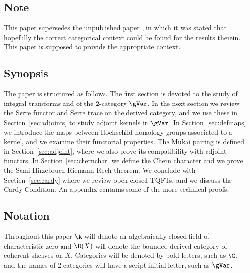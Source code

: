 \subsection*{Note} This paper supersedes the unpublished paper
\cite{CalMPI}, in which it was stated that hopefully the correct
categorical context could be found for the results therein.  This
paper is supposed to provide the appropriate context.

\subsection*{Synopsis} The paper is structured as follows.  The first
section is devoted to the study of integral transforms and of the
2-category $\gVar$.  In the next section we review the Serre functor and
Serre trace on the derived category, and we use these in
Section~\ref{sec:adjoints} to study adjoint kernels in $\gVar$.  In
Section~\ref{sec:defmaps} we introduce the maps between Hochschild
homology groups associated to a kernel, and we examine their
functorial properties.  The Mukai pairing is defined in
Section~\ref{sec:adjoint}, where we also prove its compatibility with
adjoint functors.  In Section~\ref{sec:chernchar} we define the Chern
character and we prove the Semi-Hirzebruch-Riemann-Roch theorem.  We conclude with
Section~\ref{sec:cardy} where we review open-closed TQFTs, and we
discuss the Cardy Condition.  An appendix contains some of the more
technical proofs.

\subsection*{Notation} Throughout this paper $\k$ will denote an
algebraically closed field of characteristic zero and $\D(X)$ will
denote the bounded derived category of coherent sheaves on $X$.
Categories will be denoted by bold letters, such as $\C$, and the
names of 2-categories will have a script initial letter, such as
$\gVar$.


